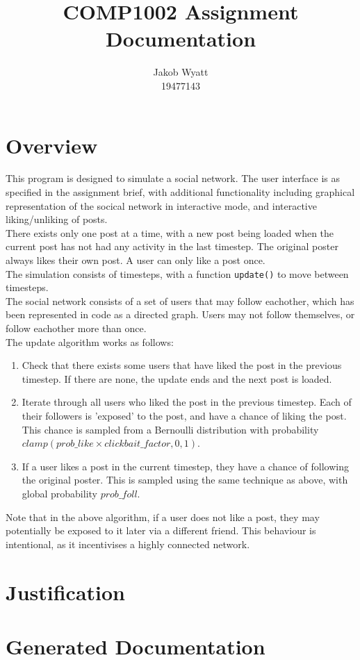 \documentclass{article}
\title{COMP1002 Assignment\\Documentation}
\author{Jakob Wyatt\\19477143}
\begin{document}
\maketitle
\pagebreak
\section{Overview}
This program is designed to simulate a social network.
The user interface is as specified in the assignment brief,
with additional functionality including graphical representation
of the socical network in interactive mode, and interactive liking/unliking 
of posts.\\
There exists only one post at a time, with a new post being loaded when the current
post has not had any activity in the last timestep. The original poster always
likes their own post. A user can only like a post once.\\
The simulation consists
of timesteps, with a function \texttt{update()} to move between timesteps.\\
The social network consists of a set of users that may follow eachother,
which has been represented in code as a directed graph. Users may not follow themselves,
or follow eachother more than once.\\
The update algorithm works as follows:
\begin{enumerate}
    \item Check that there exists some users that have liked the post in the previous timestep.
            If there are none, the update ends and the next post is loaded.
    \item Iterate through all users who liked the post in the previous timestep.
            Each of their followers is 'exposed' to the post, and have a chance of liking the post.
            This chance is sampled from a Bernoulli distribution with probability
            $clamp(\mathit{prob\_like} \times \mathit{clickbait\_factor}, 0, 1)$.
    \item If a user likes a post in the current timestep, they have a chance of following the
            original poster. This is sampled using the same technique as above, with global probability
            $\mathit{prob\_foll}$.
\end{enumerate}
Note that in the above algorithm, if a user does not like a post, they may potentially
be exposed to it later via a different friend. This behaviour is intentional, as it incentivises
a highly connected network.

\section{Justification}
\section{Generated Documentation}
\end{document}
